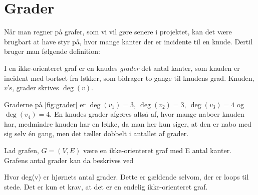\section{Grader} \label{sec:grader}
Når man regner på grafer, som vi vil gøre senere i projektet, kan det være brugbart at have styr på, hvor mange kanter der er incidente til en knude. Dertil bruger man følgende definition:

\begin{defn}[Grader] \label{defn:grader}
I en ikke-orienteret graf er en knudes \emph{grader} det antal kanter, som knuden er incident med bortset fra løkker, som bidrager to gange til knudens grad. Knuden, $v$'s, grader skrives $\deg(v)$.
\end{defn}

\begin{exmp} \label{ex:grader}

Graderne på \autoref{fig:grader} er $\deg(v_{1})=3, \ \deg(v_{2})=3, \ \deg(v_{3})=4$ og $\deg(v_{4})=4$. En knudes grader afgøres altså af, hvor mange naboer knuden har, medmindre knuden har en løkke, da man her kun siger, at den er nabo med sig selv én gang, men det tæller dobbelt i antallet af grader.


\end{exmp}

\begin{thrm}
Lad grafen, $G = (V,E)$ være en ikke-orienteret graf med E antal kanter. Grafens antal grader kan da beskrives ved 

Hvor deg(v) er hjørnets antal grader. Dette er gældende selvom, der er loops til stede. Det er kun et krav, at det er en endelig ikke-orienteret graf.

\end{thrm}